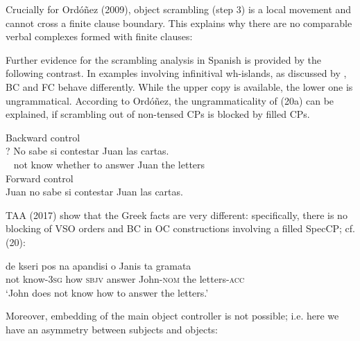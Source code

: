 \documentclass[output=paper]{langsci/langscibook}
\begin{document}
Crucially for Ordóñez (2009), object scrambling (step 3) is a local movement and cannot cross a finite clause boundary. This explains why there are no comparable verbal complexes formed with finite clauses:

\ea%
    \label{ex:alexiadou:19}
    \z
\z
    
Further evidence for the scrambling analysis in Spanish is provided by the following contrast. In examples involving infinitival wh-islands, as discussed by \citet{Torrego1996}, BC and FC behave differently. While the upper copy is available, the lower one is ungrammatical. According to Ordóñez, the ungrammaticality of (20a) can be explained, if scrambling out of non-tensed CPs is blocked by filled CPs.

\ea%
    \label{ex:alexiadou:20}
    \ea Backward control\\
    \gll *? No sabe   si   contestar Juan las cartas. \\
         ~    not   know whether {to answer} Juan the letters\\
    \ex Forward control\\Juan no sabe si contestar Juan las cartas.
    \z
\z
           

TAA (2017) show that the Greek facts are very different: specifically, there is no blocking of VSO orders and BC in OC constructions involving a filled SpecCP; cf. (20):

\ea%
    \label{ex:alexiadou:21}
    \gll de kseri          pos na apandisi     o Janis   ta gramata    \\
          not know{}-\textsc{3sg} how \textsc{sbjv} answer   John{}-\textsc{nom}   the letters{}-\textsc{acc}\\
    \glt  ‘John does not know how to answer the letters.’
    \z

Moreover, embedding of the main object controller is not possible; i.e. here we have an asymmetry between subjects and objects:
\end{document}
